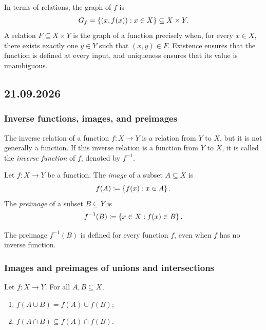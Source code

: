 \documentclass[11pt,a4paper]{amsart}
\begin{document}
In terms of relations, the graph of \(f\) is
\[
  G_f = \left\lbrace(x,f(x)) : x \in X\right\rbrace \subseteq X \times Y.
\]
A relation \(F \subseteq X \times Y\) is the graph of a function precisely
when, for every \(x \in X\), there exists exactly one \(y \in Y\) such
that \((x,y) \in F\). Existence ensures that the function is defined at
every input, and uniqueness ensures that its value is unambiguous.

\subsection{21.09.2026}

\subsubsection{Inverse functions, images, and preimages}

The inverse relation of a function \(f\colon X \to Y\) is a relation from
\(Y\) to \(X\), but it is not generally a function. If this inverse
relation is a function from \(Y\) to \(X\), it is called the
\emph{inverse function} of \(f\), denoted by \(f^{-1}\).

\begin{definition}
  Let \(f\colon X \to Y\) be a function. The \emph{image} of a subset
  \(A \subseteq X\) is
  \[
    f(A) \coloneqq \left\lbrace f(x) : x \in A\right\rbrace.
  \]
  The \emph{preimage} of a subset \(B \subseteq Y\) is
  \[
    f^{-1}(B) \coloneqq \left\lbrace x \in X : f(x) \in B\right\rbrace.
  \]
\end{definition}

\begin{remark}
  The preimage \(f^{-1}(B)\) is defined for every function \(f\), even
  when \(f\) has no inverse function.
\end{remark}

\subsubsection{Images and preimages of unions and intersections}

\begin{theorem}
  Let \(f\colon X \to Y\). For all \(A,B \subseteq X\),
  \begin{enumerate}[label=(\roman*)]
    \item \(f(A \cup B) = f(A) \cup f(B)\);
    \item \(f(A \cap B) \subseteq f(A) \cap f(B)\).
  \end{enumerate}
\end{theorem}
\end{document}
